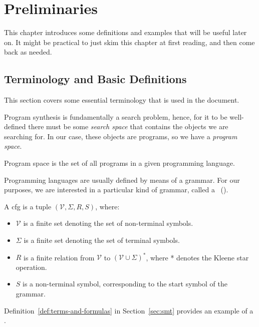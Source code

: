 \chapter{Preliminaries}
\label{chapter:preliminaries}

This chapter introduces some definitions and examples that will be useful later
on. It might be practical to just skim this chapter at first reading, and then
come back as needed.

\section{Terminology and Basic Definitions}
\label{sec:terminology}

This section covers some essential terminology that is used in the document.

Program synthesis is fundamentally a search problem, hence, for it to be
well-defined there must be some \textit{search space} that contains the objects
we are searching for.
In our case, these objects are programs, so we have a \textit{program space}.

\begin{definition}
  Program space is the set of all programs in a given programming language.
\end{definition}

Programming languages are usually defined by means of a grammar.
For our purposes, we are interested in a particular kind of grammar, called a
~().

\begin{definition}
  A \gls{cfg} is a tuple $(\mathcal{V}, \Sigma{}, R, S)$, where:
  \begin{itemize}
  \item $\mathcal{V}$ is a finite set denoting the set of non-terminal symbols.
  \item $\Sigma{}$ is a finite set denoting the set of terminal symbols.
  \item $R$ is a finite relation from $\mathcal{V}$ to $(\mathcal{V} \cup
    \Sigma{})^*$, where * denotes the Kleene star operation.
  \item $S$ is a non-terminal symbol, corresponding to the start symbol of the
    grammar.
  \end{itemize}
\end{definition}

Definition~\ref{def:terms-and-formulas} in Section~\ref{sec:smt} provides an
example of a .

